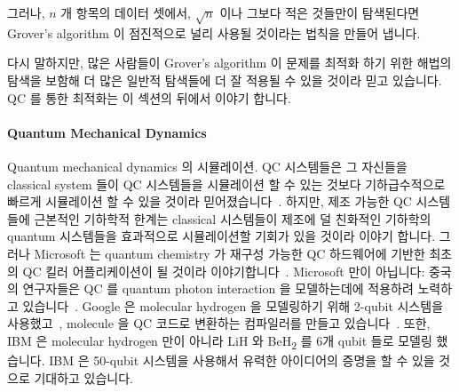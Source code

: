 그러나, $n$ 개 항목의 데이터 셋에서, $\sqrt n$ 이나 그보다 적은 것들만이
탐색된다면 Grover's algorithm 이 점진적으로 널리 사용될 것이라는 법칙을 만들어
냅니다.

다시 말하지만, 많은 사람들이 Grover's algorithm 이 문제를 최적화 하기 위한
해법의 탐색을 보함해 더 많은 일반적 탐색들에 더 잘 적용될 수 있을 것이라 믿고
있습니다.
QC 를 통한 최적화는 이 섹션의 뒤에서 이야기 합니다.

\paragraph{Quantum Mechanical Dynamics}
\label{sec:future:Quantum Mechanical Dynamics}

Quantum mechanical dynamics 의 시뮬레이션.
QC 시스템들은 그 자신들을 classical system 들이 QC 시스템들을 시뮬레이션 할 수
있는 것보다 기하급수적으로 빠르게 시뮬레이션 할 수 있을 것이라
믿어졌습니다~\cite{Feynman1982}.
하지만, 제조 가능한 QC 시스템들에 근본적인 기하학적 한계는 classical 시스템들이
제조에 덜 친화적인 기하학의 quantum 시스템들을 효과적으로 시뮬레이션할 기회가
있을 것이라 이야기 합니다.
그러나 Microsoft 는 quantum chemistry 가 재구성 가능한 QC 하드웨어에 기반한
최초의 QC 킬러 어플리케이션이 될 것이라
이야기합니다~\cite{TomSimonite2017QC-MS-Chemistry}.
Microsoft 만이 아닙니다: 중국의 연구자들은 QC 를 quantum photon interaction 을
모델하는데에 적용하려 노력하고 있습니다~\cite{StephenChen2017ChinaQC}.
Google 은 molecular hydrogen 을 모델링하기 위해 2-qubit 시스템을
사용했고~\cite{RichardChirgwin2016GoogleQC}, molecule 을 QC 코드로 변환하는
컴파일러를 만들고 있습니다~\cite{RichardChirgwin2017GoogleQC}.
또한, IBM 은 molecular hydrogen 만이 아니라 LiH 와 BeH\textsubscript{2} 를 6개
qubit 들로 모델링 했습니다.
IBM 은 50-qubit 시스템을 사용해서 유력한 아이디어의 증명을 할 수 있을 것으로
기대하고 있습니다.
\iffalse

